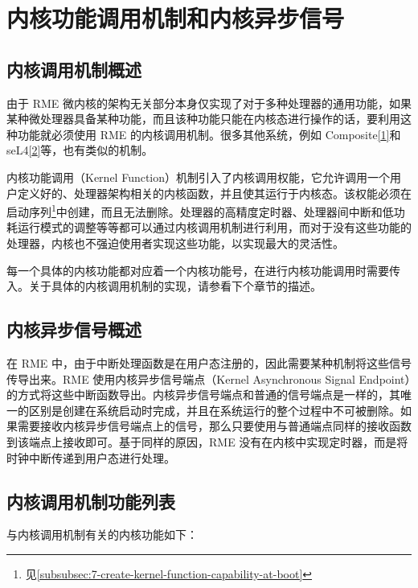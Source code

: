 \chapter{内核功能调用机制和内核异步信号}\label{ch:kernel-call-and-async-signal}

\section{内核调用机制概述}\label{sec:6-kernel-call-overview}

由于 RME 微内核的架构无关部分本身仅实现了对于多种处理器的通用功能，如果某种微处理器具备某种功能，而且该种功能只能在内核态进行操作的话，要利用这种功能就必须使用 RME 的内核调用机制。很多其他系统，例如 Composite\hyperref[cite:6-1]{{[}1{]}}和 seL4\hyperref[cite:6-2]{{[}2{]}}等，也有类似的机制。

内核功能调用（Kernel
Function）机制引入了内核调用权能，它允许调用一个用户定义好的、处理器架构相关的内核函数，并且使其运行于内核态。该权能必须在启动序列\footnote{见\ref{subsubsec:7-create-kernel-function-capability-at-boot}}中创建，而且无法删除。处理器的高精度定时器、处理器间中断和低功耗运行模式的调整等等都可以通过内核调用机制进行利用，而对于没有这些功能的处理器，内核也不强迫使用者实现这些功能，以实现最大的灵活性。

每一个具体的内核功能都对应着一个内核功能号，在进行内核功能调用时需要传入。关于具体的内核调用机制的实现，请参看下个章节的描述。

\section{内核异步信号概述}\label{sec:6-async-signal-overview}

在 RME 中，由于中断处理函数是在用户态注册的，因此需要某种机制将这些信号传导出来。RME 使用内核异步信号端点（Kernel
Asynchronous Signal
Endpoint）的方式将这些中断函数导出。内核异步信号端点和普通的信号端点是一样的，其唯一的区别是创建在系统启动时完成，并且在系统运行的整个过程中不可被删除。如果需要接收内核异步信号端点上的信号，那么只要使用与普通端点同样的接收函数到该端点上接收即可。基于同样的原因，RME 没有在内核中实现定时器，而是将时钟中断传递到用户态进行处理。

\section{内核调用机制功能列表}\label{sec:6-kernel-call-function-list}

与内核调用机制有关的内核功能如下：

